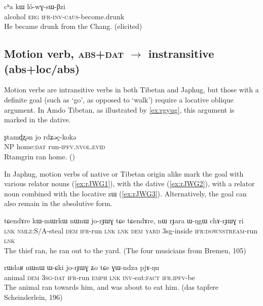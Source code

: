 \documentclass[oldfontcommands,oneside,a4paper,11pt]{article}
\newcommand{\ipa}[1]{{\phon \mbox{#1}}} %
\begin{document}
\begin{exe}
\ex \label{ex:lowGsWBzi}
\gll
\ipa{cʰa} 	\ipa{kɯ} 	\ipa{ló-wɣ-sɯ-βzi} \\ 
alcohol \textsc{erg} \textsc{ifr-inv-caus}-become.drunk \\
\glt He became drunk from the Chang. (elicited)
\end{exe}


\subsection{Motion verb, \textsc{abs+dat} $\rightarrow$ instransitive (abs+loc/abs)}  
Motion verbs are intransitive verbs in both Tibetan and Japhug, but those with a definite goal (such as `go', as opposed to `walk') require a locative oblique argument. In Amdo Tibetan, as illustrated by \ref{ex:rgyug}, this argument is marked in the dative.

\begin{exe}
\ex \label{ex:rgyug}
\gll
\ipa{ʂtamɖʐən} 	\ipa{jo} \ipa{rdʑəç-kokə} 	 \\
NP home:\textsc{dat} run-\textsc{ipfv.nvol.evid} \\
\glt Rtamgrin ran home. (\citealt[80:125]{haller04themchen})
\end{exe}

In Japhug, motion verbs of native or Tibetan origin alike mark the goal with various relator nouns (\ref{ex:rJWG1}), with the dative (\ref{ex:rJWG2}), with a relator noun combined with the locative \ipa{zɯ} (\ref{ex:rJWG3}). Alternatively, the goal can also remain in the absolutive form. 

\begin{exe}
\ex \label{ex:rJWG1}
\gll
\ipa{tɕendɤre}  	\ipa{kɯ-mɯrkɯ}  	\ipa{nɯnɯ}  	\ipa{jo-rɟɯɣ}  	\ipa{tɕe}  	\ipa{tɕendɤre,}  	\ipa{nɯ}  	\ipa{rɟara}  	\ipa{ɯ-ŋgɯ}  	\ipa{chɤ-rɟɯɣ}  	\ipa{ri}  \\
\textsc{lnk} \textsc{nmlz}:S/A-steal \textsc{dem} \textsc{ifr}-run \textsc{lnk} \textsc{lnk} \textsc{dem} \textsc{yard} 3sg-inside \textsc{ifr:downstream}-run \textsc{lnk} \\
\glt The thief ran, he ran out to the yard. (The four musicians from Bremen, 105)
\end{exe}

\begin{exe}
\ex \label{ex:rJWG2}
\gll
\ipa{rɯdaʁ}  	\ipa{nɯnɯ}  	\ipa{ɯ-ɕki}  	\ipa{jo-rɟɯɣ}  	\ipa{ʑo}  	\ipa{tɕe}  	\ipa{ɣɯ-ndza}  	\ipa{pjɤ-ŋu}  \\
animal \textsc{dem} \textsc{3sg-dat} \textsc{ifr}-run \textsc{emph} \textsc{lnk} \textsc{inv}-eat:\textsc{fact} \textsc{ifr.ipfv}-be \\
\glt The animal ran towards him, and was about to eat him. (das tapfere Scheinderlein, 196)
\end{exe}
\end{document}
